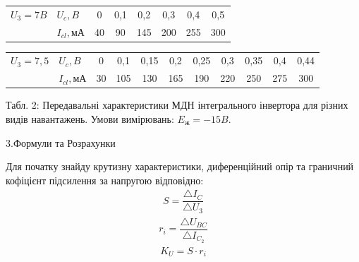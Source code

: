 \documentclass[a4paper,14pt]{extreport}
\begin{document}
\begin{tabular}{|l|l|c|c|c|c|c|c|}
\hline  {$U_{3}=7 B$} & $U_{c}, B$ & 0 & 0,1 & 0,2 & 0,3 & 0,4 & 0,5 \\
\cline { 2 - 8 } & $I_{c l}, \text{мА}$ & 40 & 90 & 145 & 200 & 255 & 300\\
\hline
\end{tabular}
\vspace{1cm}

\begin{tabular}{|c|l|c|c|c|c|c|c|c|c|c|}
\hline  {$U_{3}=7,5$} & $U_{c}, B$ & 0 & 0,1 & 0,15 & 0,2 & 0,25 & 0,3 & 0,35 & 0,4 & 0,44 \\
\cline { 2 - 11 } & $I_{c l}, \text{мА}$ & 30 & 105 & 130 & 165 & 190 & 220 & 250 & 275 & 300 \\
\hline
\end{tabular}
\vspace{1cm}

\newpage
Табл. 2: Передавальні характеристики МДН інтегрального інвертора для різних видів навантажень. Умови вимірювань: $E_{\text {ж}}=-15 B$.
\begin{figure}[h]
\end{figure}


\newpage
\begin{center}3.Формули та Розрахунки\\ \end{center}

Для початку знайду крутизну характеристики, диференційний опір та граничний кофіцієнт підсилення за напругою відповідно:
\begin{align}\label{q1}
  S = \dfrac{\triangle I_C}{\triangle U_{\text{3}}}
\end{align}
\begin{align}\label{q2}
  r_i = \dfrac{\triangle U_{BC}}{\triangle I_{C_2}}
\end{align}
\begin{align}\label{q3}
  K_U = S\cdot r_i
\end{align}
\end{document}

